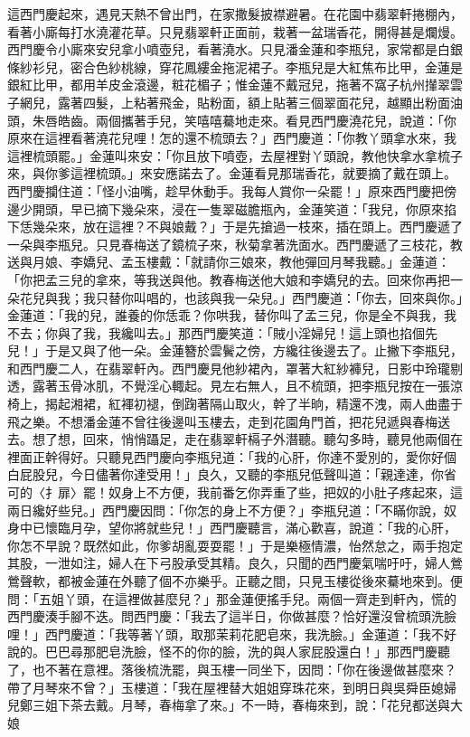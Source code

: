 這西門慶起來，遇見天熱不曾出門，在家撒髮披襟避暑。在花園中翡翠軒捲棚內，看著小廝每打水澆灌花草。只見翡翠軒正面前，栽著一盆瑞香花，開得甚是爛熳。西門慶令小廝來安兒拿小噴壺兒，看著澆水。只見潘金蓮和李瓶兒，家常都是白銀條紗衫兒，密合色紗桃線，穿花鳳縷金拖泥裙子。李瓶兒是大紅焦布比甲，金蓮是銀紅比甲，都用羊皮金滾邊，粧花楣子；惟金蓮不戴冠兒，拖著不窩子杭州攆翠雲子網兒，露著四髮，上粘著飛金，貼粉面，額上貼著三個翠面花兒，越顯出粉面油頭，朱唇皓齒。兩個攜著手兒，笑嘻嘻驀地走來。看見西門慶澆花兒，說道：「你原來在這裡看著澆花兒哩！怎的還不梳頭去？」西門慶道：「你教丫頭拿水來，我這裡梳頭罷。」金蓮叫來安：「你且放下噴壺，去屋裡對丫頭說，教他快拿水拿梳子來，與你爹這裡梳頭。」來安應諾去了。金蓮看見那瑞香花，就要摘了戴在頭上。西門慶攔住道：「怪小油嘴，趁早休動手。我每人賞你一朵罷！」原來西門慶把傍邊少開頭，早已摘下幾朵來，浸在一隻翠磁膽瓶內，金蓮笑道：「我兒，你原來掐下恁幾朵來，放在這裡？不與娘戴？」于是先搶過一枝來，插在頭上。西門慶遞了一朵與李瓶兒。只見春梅送了鏡梳子來，秋菊拿著洗面水。西門慶遞了三枝花，教送與月娘、李嬌兒、孟玉樓戴：「就請你三娘來，教他彈回月琴我聽。」金蓮道：「你把孟三兒的拿來，等我送與他。教春梅送他大娘和李嬌兒的去。回來你再把一朵花兒與我；我只替你叫唱的，也該與我一朵兒。」西門慶道：「你去，回來與你。」金蓮道：「我的兒，誰養的你恁乖？你哄我，替你叫了孟三兒，你是全不與我，我不去；你與了我，我纔叫去。」那西門慶笑道：「賊小淫婦兒！這上頭也掐個先兒！」于是又與了他一朵。金蓮簪於雲鬢之傍，方纔往後邊去了。止撇下李瓶兒，和西門慶二人，在翡翠軒內。西門慶見他紗裙內，罩著大紅紗褲兒，日影中玲瓏剔透，露著玉骨冰肌，不覺淫心輙起。見左右無人，且不梳頭，把李瓶兒按在一張涼椅上，揭起湘裙，紅褌初褪，倒踘著隔山取火，幹了半晌，精還不洩，兩人曲盡于飛之樂。不想潘金蓮不曾往後邊叫玉樓去，走到花園角門首，把花兒遞與春梅送去。想了想，回來，悄悄躡足，走在翡翠軒槅子外潛聽。聽勾多時，聽見他兩個在裡面正幹得好。只聽見西門慶向李瓶兒道：「我的心肝，你達不愛別的，愛你好個白屁股兒，今日儘著你達受用！」良久，又聽的李瓶兒低聲叫道：「親達達，你省可的〈扌扉〉罷！奴身上不方便，我前番乞你弄重了些，把奴的小肚子疼起來，這兩日纔好些兒。」西門慶因問：「你怎的身上不方便？」李瓶兒道：「不瞞你說，奴身中已懷臨月孕，望你將就些兒！」西門慶聽言，滿心歡喜，說道：「我的心肝，你怎不早說？既然如此，你爹胡亂耍耍罷！」于是樂極情濃，怡然怠之，兩手抱定其股，一泄如注，婦人在下弓股承受其精。良久，只聞的西門慶氣喘吁吁，婦人鶯鶯聲軟，都被金蓮在外聽了個不亦樂乎。正聽之間，只見玉樓從後來驀地來到。便問：「五姐丫頭，在這裡做甚麼兒？」那金蓮便搖手兒。兩個一齊走到軒內，慌的西門慶湊手腳不迭。問西門慶：「我去了這半日，你做甚麼？恰好還沒曾梳頭洗臉哩！」西門慶道：「我等著丫頭，取那茉莉花肥皂來，我洗臉。」金蓮道：「我不好說的。巴巴尋那肥皂洗臉，怪不的你的臉，洗的與人家屁股還白！」那西門慶聽了，也不著在意裡。落後梳洗罷，與玉樓一同坐下，因問：「你在後邊做甚麼來？帶了月琴來不曾？」玉樓道：「我在屋裡替大姐姐穿珠花來，到明日與吳舜臣媳婦兒鄭三姐下茶去戴。月琴，春梅拿了來。」不一時，春梅來到，說：「花兒都送與大娘